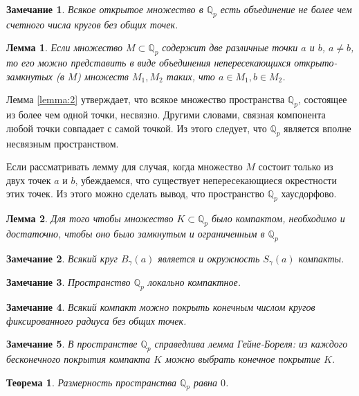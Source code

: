 \documentclass[och, master]{SCWorks}
\theoremstyle{plain}
\newtheorem{thethm}{Теорема}
\theoremstyle{plain}
\newtheorem{lemma}{Лемма}
\theoremstyle{plain}
\newtheorem{note}{Замечание}
\theoremstyle{definition}
\begin{document}
\begin{note}
Всякое открытое множество в $\mathbb {Q}_p$ есть объединение не более чем счетного числа кругов без общих точек.
\end{note}

\begin{lemma} \label{lemma:2}
Если множество $M \subset \mathbb {Q}_p$ содержит две различные точки $a$ и $b$, $a \ne b$, то его можно представить в виде объединения непересекающихся открыто-замкнутых (в $M$) множеств $M_1, M_2$ таких, что $a \in M_1, b \in M_2$.
\end{lemma}

Лемма \eqref{lemma:2} утверждает, что всякое множество пространства $\mathbb {Q}_p$, состоящее из более чем одной точки, несвязно. Другими словами, связная компонента любой точки совпадает с самой точкой. Из этого следует, что $\mathbb {Q}_p$ является вполне несвязным пространством.

Если рассматривать лемму для случая, когда множество $M$ состоит только из двух точек $a$ и $b$, убеждаемся, что существует непересекающиеся окрестности этих точек. Из этого можно сделать вывод, что пространство $\mathbb {Q}_p$ хаусдорфово.

\begin{lemma}
Для того чтобы множество $K \subset \mathbb {Q}_p$ было компактом, необходимо и достаточно, чтобы оно было замкнутым и ограниченным в $\mathbb {Q}_p$
\end{lemma}

\begin{note}
Всякий круг $B_{\gamma}(a)$ является и окружность $S_{\gamma}(a)$ компакты.
\end{note}

\begin{note}
Пространство $\mathbb {Q}_p$ локально компактное.
\end{note}

\begin{note}
Всякий компакт можно покрыть конечным числом кругов фиксированного радиуса без общих точек.
\end{note}

\begin{note}
В пространстве $\mathbb {Q}_p$ справедлива лемма Гейне-Бореля: из каждого бесконечного покрытия компакта $K$ можно выбрать конечное покрытие $K$.
\end{note}

\begin{thethm}
Размерность пространства $\mathbb {Q}_p$ равна $0$.
\end{thethm}
\end{document}
